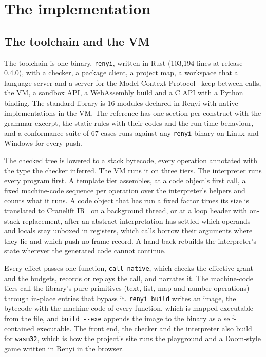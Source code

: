 \documentclass[11pt]{article}
\begin{document}
\section{The implementation}
\label{sec:implementation}

\subsection{The toolchain and the VM}

The toolchain is one binary, \texttt{renyi}, written in Rust (103,194
lines at release 0.4.0), with a checker, a package client, a project
map, a workspace that a language server and a server for the Model
Context Protocol~\citep{mcp} keep between calls, the VM, a sandbox API,
a WebAssembly build and a C API with a Python binding. The standard
library is 16 modules declared in Renyi with native implementations in
the VM. The reference has one section per construct with the grammar
excerpt, the static rules with their codes and the run-time behaviour,
and a conformance suite of 67 cases runs against any \texttt{renyi}
binary on Linux and Windows for every push.

The checked tree is lowered to a stack bytecode, every operation
annotated with the type the checker inferred. The VM runs it on three
tiers. The interpreter runs every program first. A template tier
assembles, at a code object's first call, a fixed machine-code sequence
per operation over the interpreter's helpers and counts what it runs. A
code object that has run a fixed factor times its size is translated to
Cranelift IR~\citep{cranelift} on a background thread, or at a loop
header with on-stack replacement, after an abstract interpretation has
settled which operands and locals stay unboxed in registers, which
calls borrow their arguments where they lie and which push no frame
record. A hand-back rebuilds the interpreter's state wherever the
generated code cannot continue.

Every effect passes one function, \texttt{call\_native}, which checks
the effective grant and the budgets, records or replays the call, and
narrates it. The machine-code tiers call the library's pure primitives
(text, list, map and number operations) through in-place entries that
bypass it. \texttt{renyi build} writes an image, the bytecode with the
machine code of every function, which is mapped executable from the
file, and \texttt{build -{}-exe} appends the image to the binary as a
self-contained executable. The front end, the checker and the
interpreter also build for \texttt{wasm32}, which is how the project's
site runs the playground and a Doom-style game written in Renyi in the
browser.
\end{document}
